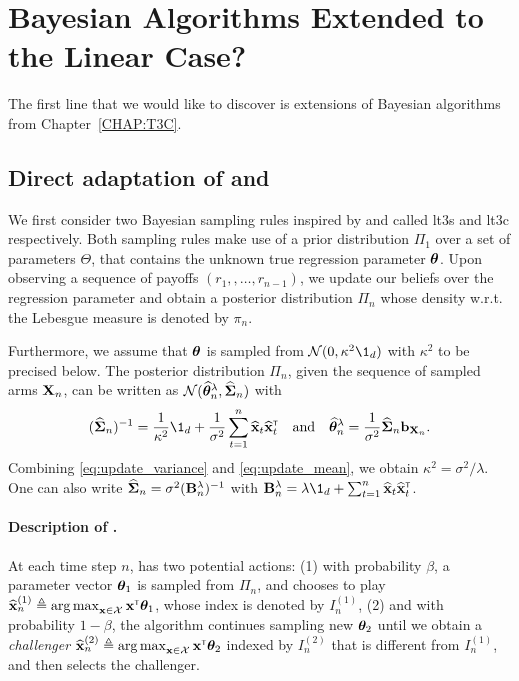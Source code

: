 \section{Bayesian Algorithms Extended to the Linear Case?}\label{sec:lgc.bayesian}

The first line that we would like to discover is extensions of Bayesian algorithms from Chapter~\ref{CHAP:T3C}.

\subsection{Direct adaptation of \TTTS{} and \TCC{}}\label{sec:lgc.bayesian.t3c}

We first consider two Bayesian sampling rules inspired by \TTTS{} and \TCC{} called \gls{lt3s} and \gls{lt3c} respectively. Both sampling rules make use of a prior distribution $\Pi_1$ over a set of parameters $\Theta$, that contains the unknown true regression parameter ${\boldsymbol \theta}$. Upon observing a sequence of payoffs $(r_1,,\ldots,r_{n-1})$, we update our beliefs over the regression parameter and obtain a posterior distribution $\Pi_{n}$ whose density w.r.t.\,the Lebesgue measure is denoted by $\pi_n$.

Furthermore, we assume that ${\boldsymbol \theta}$ is sampled from $\cN(0,\kappa^2\1_d)$ with $\kappa^2$ to be precised below. The posterior distribution $\Pi_n$, given the sequence of sampled arms ${\bf X}_n$, can be written as $\mathcal{N}(\widehat{{\boldsymbol \theta}}^\lambda_n,\widehat{{\boldsymbol \Sigma}}_n)$ %
with
\begin{align}\label{eq:update_variance}
     (\hat{\bSigma}_n)^{-1} = \frac{1}{\kappa^2}\1_d + \frac{1}{\sigma^2}\sum_{t=1}^n \hat{\bx}_t\hat{\bx}_t\transpose \quad \text{and} \quad \hat{\btheta}^\lambda_n = \frac{1}{\sigma^2}\hat{\bSigma}_n \bb_{\bX_n}.
\end{align}
Combining \eqref{eq:update_variance} and \eqref{eq:update_mean}, we obtain $\kappa^2 = \sigma^2/\lambda$. One can also write $\widehat{{\boldsymbol \Sigma}}_n = \sigma^2 ({\bf B}^{\lambda}_n)^{-1}$ with $\bB_n^\lambda = \lambda \1_d + \sum_{t=1}^n \hat{\bx}_t\hat{\bx}_t\transpose$. 

\paragraph{Description of \LTCS.} At each time step $n$, \LTCS has two potential actions: (1) with probability $\beta$, a parameter vector ${\boldsymbol \theta}_1$ is sampled from $\Pi_{n}$, and \LTCS chooses to play $\widehat{{\bf x}}_n^{(1)} \triangleq \operatorname*{arg\,max}_{{\bf x}\in\mathcal{X}} {\bf x}^\mathsf{\scriptscriptstyle T}{\boldsymbol \theta}_1$, whose index is denoted by $I_n^{(1)}$, (2) and with probability $1-\beta$, the algorithm continues sampling new ${\boldsymbol \theta}_2$ until we obtain a \emph{challenger} $\widehat{{\bf x}}_n^{(2)} \triangleq \operatorname*{arg\,max}_{{\bf x}\in\mathcal{X}} {\bf x}^\mathsf{\scriptscriptstyle T}{\boldsymbol \theta}_2$ indexed by $I_n^{(2)}$ that is different from $I_n^{(1)}$, and \LTCS then selects the challenger.


